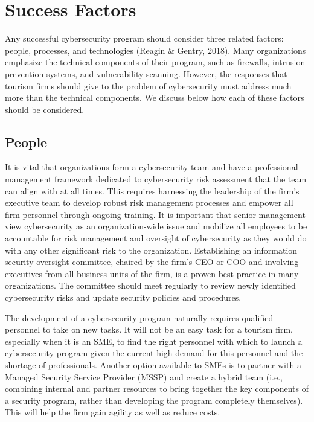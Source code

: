 \documentclass[
  letterpaper,
  DIV=11,
  numbers=noendperiod]{scrreprt}
\begin{document}
\hypertarget{success-factors}{%
\section{Success Factors}\label{success-factors}}

Any successful cybersecurity program should consider three related
factors: people, processes, and technologies (Reagin \& Gentry, 2018).
Many organizations emphasize the technical components of their program,
such as firewalls, intrusion prevention systems, and vulnerability
scanning. However, the responses that tourism firms should give to the
problem of cybersecurity must address much more than the technical
components. We discuss below how each of these factors should be
considered.

\hypertarget{people}{%
\subsection{People}\label{people}}

It is vital that organizations form a cybersecurity team and have a
professional management framework dedicated to cybersecurity risk
assessment that the team can align with at all times. This requires
harnessing the leadership of the firm's executive team to develop robust
risk management processes and empower all firm personnel through ongoing
training. It is important that senior management view cybersecurity as
an organization-wide issue and mobilize all employees to be accountable
for risk management and oversight of cybersecurity as they would do with
any other significant risk to the organization. Establishing an
information security oversight committee, chaired by the firm's CEO or
COO and involving executives from all business units of the firm, is a
proven best practice in many organizations. The committee should meet
regularly to review newly identified cybersecurity risks and update
security policies and procedures.

The development of a cybersecurity program naturally requires qualified
personnel to take on new tasks. It will not be an easy task for a
tourism firm, especially when it is an SME, to find the right personnel
with which to launch a cybersecurity program given the current high
demand for this personnel and the shortage of professionals. Another
option available to SMEs is to partner with a Managed Security Service
Provider (MSSP) and create a hybrid team (i.e., combining internal and
partner resources to bring together the key components of a security
program, rather than developing the program completely themselves). This
will help the firm gain agility as well as reduce costs.
\end{document}
